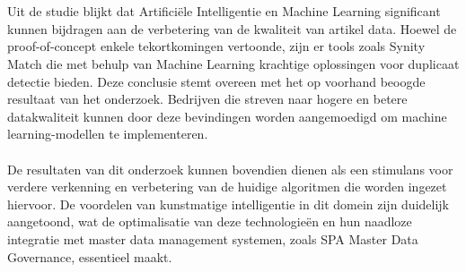 \\ \\Uit de studie blijkt dat Artificiële Intelligentie en Machine Learning significant kunnen bijdragen aan de verbetering  van de kwaliteit van artikel data. Hoewel de proof-of-concept enkele tekortkomingen vertoonde, zijn er tools zoals Synity Match die met behulp van Machine Learning krachtige oplossingen voor duplicaat detectie bieden. Deze conclusie stemt overeen met het op voorhand beoogde resultaat van het onderzoek. Bedrijven die streven naar hogere en betere datakwaliteit kunnen door deze bevindingen worden aangemoedigd om machine learning-modellen te implementeren.
\\ \\De resultaten van dit onderzoek kunnen bovendien dienen als een stimulans voor verdere verkenning en verbetering van de huidige algoritmen die worden ingezet hiervoor. De voordelen van kunstmatige intelligentie in dit domein zijn duidelijk aangetoond, wat de optimalisatie van deze technologieën en hun naadloze integratie met master data management systemen, zoals SPA Master Data Governance, essentieel maakt.
